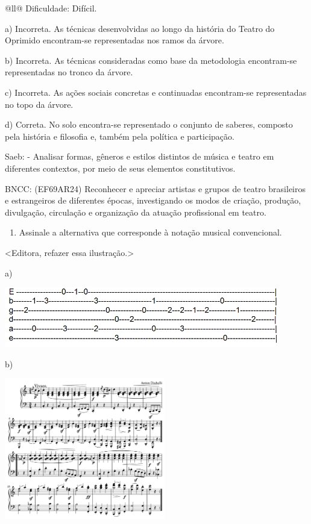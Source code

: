 \begin{itemize}
\begin{itemize}
\begin{escolha}[]{@{}ll@{}}
Dificuldade: Difícil.

a) Incorreta. As técnicas desenvolvidas ao longo da história do Teatro
do Oprimido encontram-se representadas nos ramos da árvore.

b) Incorreta. As técnicas consideradas como base da metodologia
encontram-se representadas no tronco da árvore.

c) Incorreta. As ações sociais concretas e continuadas encontram-se
representadas no topo da árvore.

d) Correta. No solo encontra-se representado o conjunto de saberes,
composto pela história e filosofia e, também pela política e
participação.

Saeb: - Analisar formas, gêneros e estilos distintos de música e teatro
em diferentes contextos, por meio de seus elementos constitutivos.

BNCC: (EF69AR24) Reconhecer e apreciar artistas e grupos de teatro
brasileiros e estrangeiros de diferentes épocas, investigando os modos
de criação, produção, divulgação, circulação e organização da atuação
profissional em teatro.

\begin{enumerate}
\def\labelenumi{\arabic{enumi}.}
\item
  Assinale a alternativa que corresponde à notação musical convencional.
\end{enumerate}

\textless{}Editora, refazer essa ilustração.\textgreater{}

a)

\includegraphics[width=4.75000in,height=1.03125in]{media/image31.jpeg}

b)

\includegraphics[width=2.76042in,height=2.43750in]{media/image32.png}


\end{escolha}
\end{itemize}
\end{itemize}
